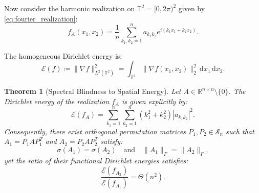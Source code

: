 \documentclass[11pt,a4paper,reqno]{amsart}
\newtheorem{theorem}{Theorem}[section]
\theoremstyle{definition}
\numberwithin{equation}{section}
\newcommand{\R}{\mathbb{R}}
\newcommand{\Tor}{\mathbb{T}}
\newcommand{\dif}{\,\mathrm{d}}
\begin{document}
Now consider the harmonic realization on $\Tor^2 = [0, 2\pi)^2$ given by \eqref{eq:fourier_realization}:
\begin{equation}
    f_A(x_1, x_2) = \frac{1}{n} \sum_{k_1, k_2 = 1}^n a_{k_1 k_2} e^{i (k_1 x_1 + k_2 x_2)}.
\end{equation}

The homogeneous Dirichlet energy is:
\begin{equation}
    \mathcal{E}(f) \coloneqq \|\nabla f\|_{L^2(\Tor^2)}^2 = \int_{\Tor^2} \|\nabla f(x_1, x_2)\|_2^2 \dif x_1 \dif x_2.
\end{equation}

\begin{theorem}[Spectral Blindness to Spatial Energy]
\label{thm:dirichlet_blindness}
Let $A \in \R^{n \times n} \setminus \{0\}$. The Dirichlet energy of the realization $f_A$ is given explicitly by:
\begin{equation}
    \label{eq:dirichlet_energy_formula}
    \mathcal{E}(f_A) = \sum_{k_1=1}^n \sum_{k_2=1}^n (k_1^2 + k_2^2) |a_{k_1 k_2}|^2.
\end{equation}
Consequently, there exist orthogonal permutation matrices $P_1, P_2 \in \mathcal{S}_n$ such that $A_1 = P_1 A P_1^T$ and $A_2 = P_2 A P_2^T$ satisfy:
\begin{equation}
    \sigma(A_1) = \sigma(A_2) \quad \text{and} \quad \|A_1\|_F = \|A_2\|_F,
\end{equation}
yet the ratio of their functional Dirichlet energies satisfies:
\begin{equation}
    \frac{\mathcal{E}(f_{A_2})}{\mathcal{E}(f_{A_1})} = \Theta(n^2).
\end{equation}
\end{theorem}
\end{document}
